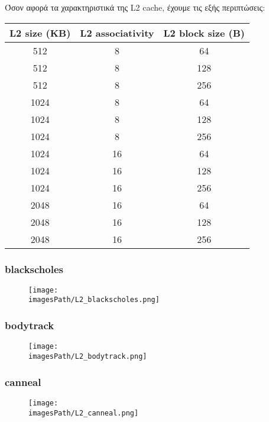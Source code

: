 \documentclass[12pt,a4paper]{article}
\newcommand{\imagesPath}{parsec-3.0/parsec_workspace/graphs}
\begin{document}
			Όσον αφορά τα χαρακτηριστικά της L2 cache, έχουμε τις εξής περιπτώσεις:
	
			\begin{center}
				\begin{tabular}{|c|c|c|}
					\hline
					L2 size (KB) & L2 associativity & L2 block size (B) \\
					\hline
					512 & 8 & 64 \\
					\hline
					512 & 8 & 128 \\
					\hline
					512 & 8 & 256 \\
					\hline
					1024 & 8 & 64 \\
					\hline
					1024 & 8 & 128 \\
					\hline
					1024 & 8 & 256 \\
					\hline
					1024 & 16 & 64 \\
					\hline
					1024 & 16 & 128 \\
					\hline
					1024 & 16 & 256 \\
					\hline
					2048 & 16 & 64 \\
					\hline 
					2048 & 16 & 128 \\
					\hline
					2048 & 16 & 256 \\
					\hline
				\end{tabular}
			\end{center}
		
			\subsubsection{blackscholes}
				\begin{figure}[H]
					\begin{center}
						\texttt{[image: \\imagesPath/L2\_blackscholes.png]}
					\end{center}
				\end{figure}
						
			\subsubsection{bodytrack}
				\begin{figure}[H]
					\begin{center}
						\texttt{[image: \\imagesPath/L2\_bodytrack.png]}
					\end{center}
				\end{figure}
						
			\subsubsection{canneal}
				\begin{figure}[H]
					\begin{center}
						\texttt{[image: \\imagesPath/L2\_canneal.png]}
					\end{center}
				\end{figure}
						
\end{document}
